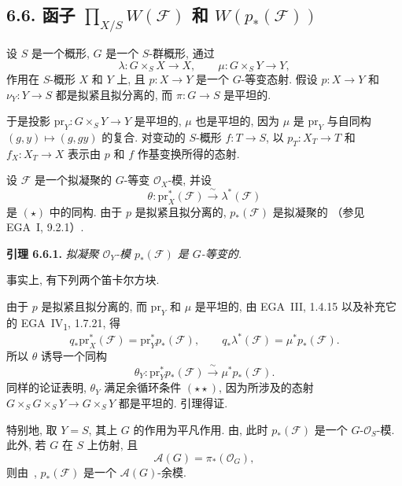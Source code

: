 \subsection*{6.6. 函子
\(\prod_{X/S}W(\mathcal F)\) 和 \(W(p_*(\mathcal F))\)}

设 \(S\) 是一个概形, \(G\) 是一个 \(S\)-群概形, 通过
\[
  \lambda:G\times_SX\to X,
  \qquad
  \mu:G\times_SY\to Y,
\]
作用在 \(S\)-概形 \(X\) 和 \(Y\) 上, 且 \(p:X\to Y\) 是一个
\(G\)-等变态射. 假设 \(p:X\to Y\) 和 \(\nu_Y:Y\to S\)
都是拟紧且拟分离的, 而 \(\pi:G\to S\) 是平坦的.

于是投影 \(\mathrm{pr}_Y:G\times_SY\to Y\) 是平坦的,
\(\mu\) 也是平坦的, 因为 \(\mu\) 是 \(\mathrm{pr}_Y\) 与自同构
\((g,y)\mapsto(g,gy)\) 的复合. 对变动的 \(S\)-概形
\(f:T\to S\), 以 \(p_T:X_T\to T\) 和 \(f_X:X_T\to X\)
表示由 \(p\) 和 \(f\) 作基变换所得的态射.

设 \(\mathcal F\) 是一个拟凝聚的 \(G\)-等变 \(\mathcal O_X\)-模,
并设
\[
  \theta:\mathrm{pr}_X^*(\mathcal F)
  \xrightarrow{\ \sim\ }\lambda^*(\mathcal F)
\]
是  \((\star)\) 中的同构.
由于 \(p\) 是拟紧且拟分离的, \(p_*(\mathcal F)\) 是拟凝聚的
（参见 EGA~I, 9.2.1）.

\medskip
\noindent{}\textbf{引理 6.6.1.}
\textit{拟凝聚 \(\mathcal O_Y\)-模 \(p_*(\mathcal F)\) 是 \(G\)-等变的.}

事实上, 有下列两个笛卡尔方块.

\begin{figure}[H]
  \centering
  
  \label{fig:sga3-exp1-p045-base-change-squares}
\end{figure}

由于 \(p\) 是拟紧且拟分离的, 而 \(\mathrm{pr}_Y\) 和 \(\mu\)
是平坦的, 由 EGA~III, 1.4.15 以及补充它的
EGA~IV\textsubscript{1}, 1.7.21, 得
\[
  q_*\mathrm{pr}_X^*(\mathcal F)
    =\mathrm{pr}_Y^*p_*(\mathcal F),
  \qquad
  q_*\lambda^*(\mathcal F)
    =\mu^*p_*(\mathcal F).
\]
所以 \(\theta\) 诱导一个同构
\[
  \theta_Y:\mathrm{pr}_Y^*p_*(\mathcal F)
  \xrightarrow{\ \sim\ }\mu^*p_*(\mathcal F).
\]
同样的论证表明, \(\theta_Y\) 满足余循环条件
 \((\star\star)\),
因为所涉及的态射 \(G\times_SG\times_SY\to G\times_SY\) 都是平坦的.
引理得证.

特别地, 取 \(Y=S\), 其上 \(G\) 的作用为平凡作用.
由, 此时
\(p_*(\mathcal F)\) 是一个 \(G\)-\(\mathcal O_S\)-模.
此外, 若 \(G\) 在 \(S\) 上仿射, 且
\[
  \mathscr A(G)=\pi_*(\mathcal O_G),
\]
则由~,
\(p_*(\mathcal F)\) 是一个 \(\mathscr A(G)\)-余模.

